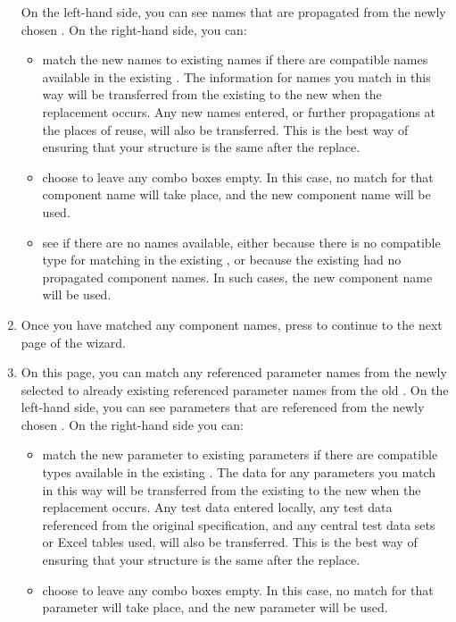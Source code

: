 \begin{enumerate}
On the left-hand side, you can see names that are propagated from the newly chosen \gdcase{}. On the right-hand side, you can:
\begin{itemize}
\item  match the new names to existing names if there are compatible names available in the existing \gdcase{}. The information for names you match in this way will be transferred from the existing \gdcase{} to the new \gdcase{} when the replacement occurs. Any new names entered, or further propagations at the places of reuse, will also be transferred. This is the best way of ensuring that your \gdproject{} structure is the same after the replace. 
\item choose to leave any combo boxes empty. In this case, no match for that component name will take place, and the new component name will be used. 
\item see if there are no names available, either because there is no compatible type for matching in the existing \gdcase{}, or because the existing \gdcase{} had no propagated component names. In such cases, the new component name will be used.
\end{itemize}
\item Once you have matched any component names, press  to continue to the next page of the wizard.
\item On this page, you can match any referenced parameter names  from the newly selected \gdcase{} to already existing referenced parameter names from the old \gdcase{}. On the left-hand side, you can see parameters that are referenced from the newly chosen \gdcase{}. On the right-hand side you can:
\begin{itemize}
\item  match the new parameter to existing parameters if there are compatible types available in the existing \gdcase{}. The data for any parameters you match in this way will be transferred from the existing \gdcase{} to the new \gdcase{} when the replacement occurs. Any test data entered locally, any test data referenced from the original specification, and any central test data sets or Excel tables used, will also be transferred. This is the best way of ensuring that your \gdproject{} structure is the same after the replace. 
\item choose to leave any combo boxes empty. In this case, no match for that parameter will take place, and the new parameter will be used. 

\end{itemize}
\end{enumerate}
